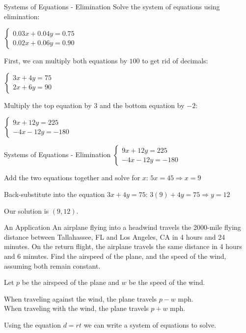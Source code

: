 \documentclass[t, aspectratio=169]{beamer}
\def\then{\Rightarrow}
\begin{document}
	\begin{frame}{Systems of Equations - Elimination}
		Solve the system of equations using elimination:
		
		$\begin{cases}
		0.03x + 0.04y = 0.75 \\
		0.02x + 0.06y = 0.90
		\end{cases}$ \pause
		
		First, we can multiply both equations by $100$ to get rid of decimals: \pause
		
		$\begin{cases}
		3x + 4y = 75 \\
		2x + 6y = 90
		\end{cases}$ \pause
		
		Multiply the top equation by $3$ and the bottom equation by $-2$: \pause
		
		$\begin{cases}
		9x + 12y = 225 \\
		-4x - 12y = -180
		\end{cases}$
	\end{frame}

	\begin{frame}{Systems of Equations - Elimination}
		$\begin{cases}
		9x + 12y = 225 \\
		-4x - 12y = -180
		\end{cases}$
		
		Add the two equations together and solve for $x$: $5x = 45 \then x = 9$ \pause
		
		Back-substitute into the equation $3x + 4y = 75$: $3(9) + 4y = 75 \then y = 12$ \pause
		
		Our solution is $(9, 12)$.
	\end{frame}

	\begin{frame}{An Application}
		An airplane flying into a headwind travels the 2000-mile flying distance between Tallahassee, FL and Los Angeles, CA in 4 hours and 24 minutes. On the return flight, the airplane travels the same distance in 4 hours and 6 minutes. Find the airspeed of the plane, and the speed of the wind, assuming both remain constant. \pause
		
		Let $p$ be the airspeed of the plane and $w$ be the speed of the wind. \pause
		
		When traveling against the wind, the plane travels $p - w$ mph. \\
		When traveling with the wind, the plane travels $p + w$ mph. \pause
		
		Using the equation $d = rt$ we can write a system of equations to solve.
	\end{frame}
\end{document}
